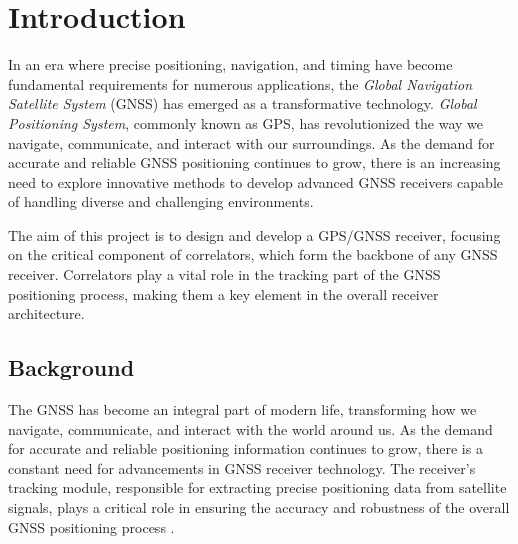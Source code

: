 \chapter{Introduction}
In an era where precise positioning, navigation, and timing have become fundamental requirements for numerous applications, the \textit{Global Navigation Satellite System} (GNSS) has emerged as a transformative technology. \textit{Global Positioning System}, commonly known as GPS, has revolutionized the way we navigate, communicate, and interact with our surroundings. As the demand for accurate and reliable GNSS positioning continues to grow, there is an increasing need to explore innovative methods to develop advanced GNSS receivers capable of handling diverse and challenging environments.

The aim of this project is to design and develop a GPS/GNSS receiver, focusing on the critical component of correlators, which form the backbone of any GNSS receiver. Correlators play a vital role in the tracking part of the GNSS positioning process, making them a key element in the overall receiver architecture.

\section{Background}
The GNSS has become an integral part of modern life, transforming how we navigate, communicate, and interact with the world around us. As the demand for accurate and reliable positioning information continues to grow, there is a constant need for advancements in GNSS receiver technology. The receiver's tracking module, responsible for extracting precise positioning data from satellite signals, plays a critical role in ensuring the accuracy and robustness of the overall GNSS positioning process \cite{RN151}.

